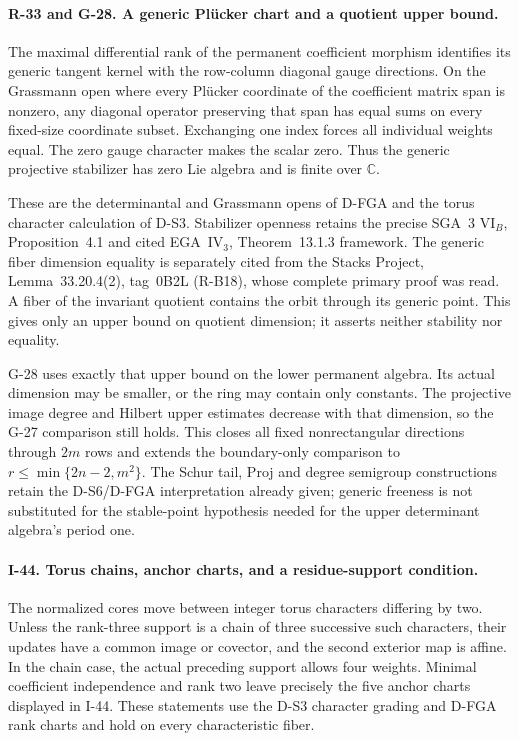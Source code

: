 \paragraph{R-33 and G-28. A generic Pl\"ucker chart and a quotient upper bound.}
The maximal differential rank of the permanent coefficient
morphism identifies its generic tangent kernel with the
row-column diagonal gauge directions. On the Grassmann
open where every Pl\"ucker coordinate of the coefficient
matrix span is nonzero, any diagonal operator preserving
that span has equal sums on every fixed-size coordinate
subset. Exchanging one index forces all individual weights
equal. The zero gauge character makes the scalar zero.
Thus the generic projective stabilizer has zero Lie algebra
and is finite over $\mathbb C$.

These are the determinantal and Grassmann opens of D-FGA
and the torus character calculation of D-S3. Stabilizer
openness retains the precise SGA~3 VI$_B$, Proposition~4.1
and cited EGA~IV$_3$, Theorem~13.1.3 framework. The generic
fiber dimension equality is separately cited from the
Stacks Project, Lemma~33.20.4(2), tag~0B2L (R-B18), whose
complete primary proof was read. A fiber of the invariant
quotient contains the orbit through its generic point.
This gives only an upper bound on quotient dimension;
it asserts neither stability nor equality.

G-28 uses exactly that upper bound on the lower permanent
algebra. Its actual dimension may be smaller, or the ring
may contain only constants. The projective image degree and
Hilbert upper estimates decrease with that dimension, so
the G-27 comparison still holds. This closes all fixed
nonrectangular directions through $2m$ rows and extends
the boundary-only comparison to
$r\le\min\{2n-2,m^2\}$. The Schur tail, Proj and degree
semigroup constructions retain the D-S6/D-FGA interpretation
already given; generic freeness is not substituted for
the stable-point hypothesis needed for the upper determinant
algebra's period one.

\paragraph{I-44. Torus chains, anchor charts, and a residue-support condition.}
The normalized cores move between integer torus characters
differing by two. Unless the rank-three support is a chain
of three successive such characters, their updates have
a common image or covector, and the second exterior map
is affine. In the chain case, the actual preceding support
allows four weights. Minimal coefficient independence and
rank two leave precisely the five anchor charts displayed
in I-44. These statements use the D-S3 character grading
and D-FGA rank charts and hold on every characteristic fiber.

